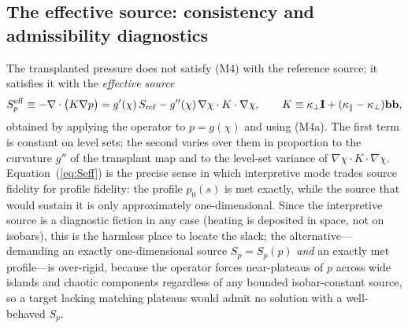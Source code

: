 \documentclass[english]{article}
\newcommand{\bb}{\mathbf{b}}
\newcommand{\bI}{\mathbf{I}}
\begin{document}
\subsection{The effective source: consistency and admissibility diagnostics}
\label{sec:Seff}

The transplanted pressure does not satisfy (M4) with the reference source; it satisfies it with the
\emph{effective source}
\begin{equation}
S_p^{\rm eff}\equiv-\nabla\cdot\big(K\nabla p\big)
=g'(\chi)\,S_{\rm ref}-g''(\chi)\,\nabla\chi\cdot K\cdot\nabla\chi ,
\qquad K\equiv\kappa_\perp\bI+(\kappa_\parallel-\kappa_\perp)\bb\bb ,
\label{eq:Seff}
\end{equation}
obtained by applying the operator to $p=g(\chi)$ and using (M4a). The first term is constant on
level sets; the second varies over them in proportion to the curvature $g''$ of the transplant map
and to the level-set variance of $\nabla\chi\cdot K\cdot\nabla\chi$. Equation~(\ref{eq:Seff}) is
the precise sense in which interpretive mode trades source fidelity for profile fidelity: the
profile $p_0(s)$ is met exactly, while the source that would sustain it is only approximately
one-dimensional. Since the interpretive source is a diagnostic fiction in any case (heating is
deposited in space, not on isobars), this is the harmless place to locate the slack; the
alternative---demanding an exactly one-dimensional source $S_p=S_p(p)$ \emph{and} an exactly met
profile---is over-rigid, because the operator forces near-plateaus of $p$ across wide islands and
chaotic components regardless of any bounded isobar-constant source, so a target lacking matching
plateaus would admit no solution with a well-behaved $S_p$.
\end{document}
